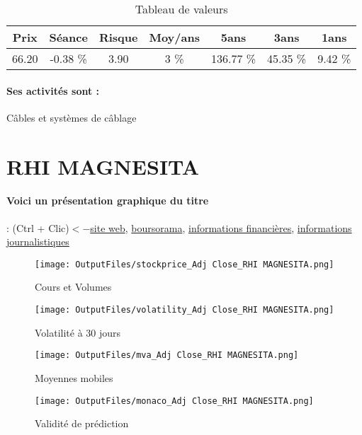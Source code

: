 \documentclass[11pt,a4paper]{report}%
\begin{document}
\begin{table}[H]
  \centering
    \begin{tabular}{|c|c|c|c|c|c|c|}
    \hline
    Prix & Séance & Risque  & Moy/ans & 5ans & 3ans & 1ans \\
    \hline
    66.20 &    -0.38 \%    & 3.90 & 3 \% & 136.77 \% & 45.35 \% & 9.42 \% \\
    \hline
    \end{tabular}%
        \label{tab:table_NEXANS}%
      \caption{Tableau de valeurs}
\end{table}%

\paragraph{Ses activités sont : } Câbles et systèmes de câblage  
    
    \newpage

\section{RHI MAGNESITA}

\paragraph{Voici un présentation graphique du titre} : (Ctrl + Clic)$<-$\href{https://ir.rhimagnesita.com/}{site web}, \href{https://www.boursorama.com/cours/1rPRHF}{boursorama}, \href{https://www.qwant.com/?q=site:https:%2f%2fwww.easybourse.com%2faction-societe%2fRHI-MAGNESITA&t=web&client=ext-firefox-hp}{informations financières}, \href{https://bourse.lerevenu.com/cours-de-bourse/fiche-valeur-synthese/RHI-MAGNESITA/RHF.F}{informations journalistiques}
\begin{figure}[!htb]
   \begin{minipage}{0.5\textwidth}
     \centering
     \texttt{[image: OutputFiles/stockprice\_Adj Close\_RHI MAGNESITA.png]}
     \caption{Cours et Volumes}\label{Fig:price_RHI MAGNESITA}
   \end{minipage}\hfill
   \begin{minipage}{0.5\textwidth}
     \centering
     \texttt{[image: OutputFiles/volatility\_Adj Close\_RHI MAGNESITA.png]}
     \caption{Volatilité à 30 jours}\label{Fig:volat_RHI MAGNESITA}
   \end{minipage}
\end{figure}
\begin{figure}[!htb]
   \begin{minipage}{0.5\textwidth}
     \centering
     \texttt{[image: OutputFiles/mva\_Adj Close\_RHI MAGNESITA.png]}
     \caption{Moyennes mobiles}\label{Fig:mva_RHI MAGNESITA}
   \end{minipage}\hfill
   \begin{minipage}{0.5\textwidth}
     \centering
     \texttt{[image: OutputFiles/monaco\_Adj Close\_RHI MAGNESITA.png]}
     \caption{Validité de prédiction}\label{Fig:prediction_RHI MAGNESITA}
   \end{minipage}
\end{figure}
\end{document}

